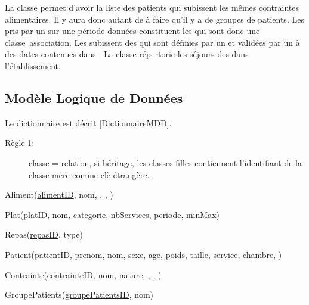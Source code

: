La classe  permet d'avoir la liste des patients qui subissent les mêmes contraintes alimentaires. Il y aura donc autant de  à faire qu'il y a de groupes de patients. Les  pris par un  sur une période données constituent les  qui sont donc une classe~association.
Les  subissent des  qui sont définies par un  et validées par un  à des dates contenues dans . La classe  répertorie les séjours des  dans l'établissement.

\subsection{Modèle Logique de Données}
Le dictionnaire est décrit \autoref{DictionnaireMDD}.
\begin{description}
\item[Règle 1:] classe = relation, si héritage, les classes filles contiennent l'identifiant de la classe mère comme clè étrangère.
\end{description}

Aliment(\underline{alimentID}, nom, , , )


Plat(\underline{platID}, nom, categorie, nbServices, periode, minMax)


Repas(\underline{repasID}, type)

Patient(\underline{patientID}, prenom, nom, sexe, age, poids, taille, service, chambre, )

Contrainte(\underline{contrainteID}, nom, nature, , , )


GroupePatients(\underline{groupePatientsID}, nom)


